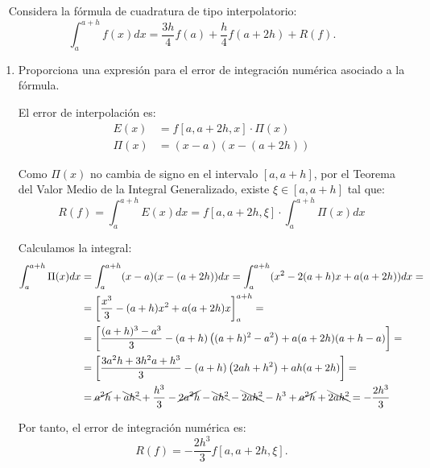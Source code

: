 \begin{ejercicio}[DGIIM 2023/24]~\label{ej:2.3.9}
    Considera la fórmula de cuadratura de tipo interpolatorio:
    \begin{equation*}
        \int_{a}^{a+h} f(x)dx = \frac{3h}{4}f(a) + \frac{h}{4}f(a + 2h) + R(f).
    \end{equation*}
    \begin{enumerate}
        \item Proporciona una expresión para el error de integración numérica asociado a la fórmula.
        
        El error de interpolación es:
        \begin{align*}
            E(x) &= f[a, a + 2h, x]\cdot \Pi(x)\\
            \Pi(x) &= (x - a)(x - (a + 2h))
        \end{align*}

        Como $\Pi(x)$ no cambia de signo en el intervalo $[a, a + h]$, por el Teorema del Valor Medio de la Integral Generalizado, existe $\xi\in [a, a + h]$ tal que:
        \begin{equation*}
            R(f) = \int_{a}^{a+h} E(x)dx = f[a, a + 2h, \xi]\cdot \int_{a}^{a+h} \Pi(x)dx
        \end{equation*}

        Calculamos la integral:
        \begin{align*}
            \int_{a}^{a+h} \Pi(x)dx &= \int_{a}^{a+h} (x - a)(x - (a + 2h))dx
            = \int_{a}^{a+h} (x^2 -2(a + h)x + a(a + 2h))dx =\\
            &= \left[\dfrac{x^3}{3} - (a + h)x^2 + a(a + 2h)x\right]_{a}^{a+h}
            =\\&= \left[\dfrac{(a + h)^3 - a^3}{3} - (a + h)\left((a + h)^2 - a^2\right) + a(a + 2h)(a + h - a)\right]
            =\\&= \left[\dfrac{3a^2h + 3h^2a + h^3}{3} - (a + h)\left(2ah + h^2\right) + ah(a + 2h)\right]
            =\\&= \cancel{a^2h} + \bcancel{ah^2} + \dfrac{h^3}{3} - \cancel{2a^2h} - \bcancel{ah^2} -\bcancel{2ah^2} - h^3 + \cancel{a^2h}+ \bcancel{2ah^2}
            = -\dfrac{2h^3}{3}
        \end{align*}

        Por tanto, el error de integración numérica es:
        \begin{equation*}
            R(f) = -\dfrac{2h^3}{3}f[a, a + 2h, \xi].
        \end{equation*}


\end{enumerate}
\end{ejercicio}
